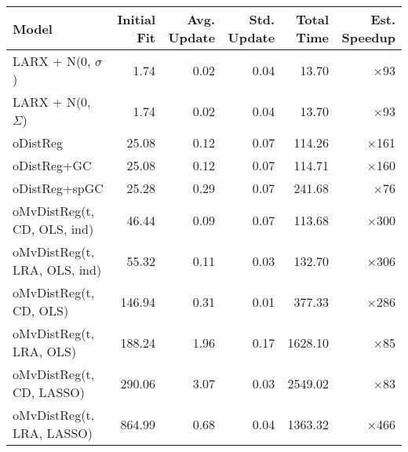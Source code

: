 \begin{tabular}{lrrrrr}
\toprule
Model & Initial Fit & Avg. Update & Std. Update & Total Time & Est. Speedup \\
\midrule
LARX + N(0, $\sigma$) & 1.74 & 0.02 & 0.04 & 13.70 & $\times$93 \\
LARX + N(0, $\Sigma$) & 1.74 & 0.02 & 0.04 & 13.70 & $\times$93 \\
oDistReg & 25.08 & 0.12 & 0.07 & 114.26 & $\times$161 \\
oDistReg+GC & 25.08 & 0.12 & 0.07 & 114.71 & $\times$160 \\
oDistReg+spGC & 25.28 & 0.29 & 0.07 & 241.68 & $\times$76 \\
oMvDistReg(t, CD, OLS, ind) & 46.44 & 0.09 & 0.07 & 113.68 & $\times$300 \\
oMvDistReg(t, LRA, OLS, ind) & 55.32 & 0.11 & 0.03 & 132.70 & $\times$306 \\
oMvDistReg(t, CD, OLS) & 146.94 & 0.31 & 0.01 & 377.33 & $\times$286 \\
oMvDistReg(t, LRA, OLS) & 188.24 & 1.96 & 0.17 & 1628.10 & $\times$85 \\
oMvDistReg(t, CD, LASSO) & 290.06 & 3.07 & 0.03 & 2549.02 & $\times$83 \\
oMvDistReg(t, LRA, LASSO) & 864.99 & 0.68 & 0.04 & 1363.32 & $\times$466 \\
\bottomrule
\end{tabular}
